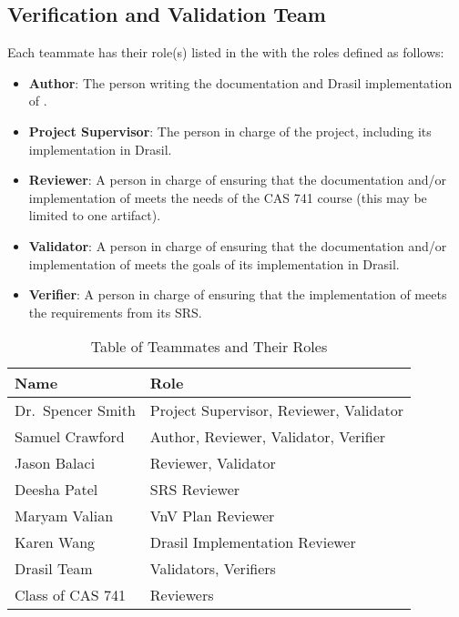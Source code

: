 \documentclass[12pt, titlepage]{article}
\begin{document}
\subsection{Verification and Validation Team} \label{sec_vnv_team}

Each teammate has their role(s) listed in the  with the
roles defined as follows:

\begin{itemize}
  \item \textbf{Author}: The person writing the documentation and Drasil
        implementation of \progname{}.

  \item \textbf{Project Supervisor}: The person in charge of the \progname{}
        project, including its implementation in Drasil.

  \item \textbf{Reviewer}: A person in charge of ensuring that the
        documentation and/or implementation of \progname{} meets the needs of
        the CAS 741 course (this may be limited to one artifact).

  \item \textbf{Validator}: A person in charge of ensuring that the
        documentation and/or implementation of \progname{} meets the goals of
        its implementation in Drasil.

  \item \textbf{Verifier}: A person in charge of ensuring that the
        implementation of \progname{} meets the requirements from its SRS.

\end{itemize}

\begin{table}[h!]
  \centering
  \begin{tabular}{| l | l |}
    \hline
    \rowcolor[gray]{0.9}
    \bf Name          & \bf Role                                \\
    \hline
    Dr.~Spencer Smith & Project Supervisor, Reviewer, Validator \\
    \hline
    Samuel Crawford   & Author, Reviewer, Validator, Verifier   \\
    \hline
    Jason Balaci      & Reviewer, Validator                     \\
    \hline
    Deesha Patel      & SRS Reviewer                            \\
    \hline
    Maryam Valian     & VnV Plan Reviewer                       \\
    \hline
    Karen Wang        & Drasil Implementation Reviewer          \\
    \hline
    Drasil Team       & Validators, Verifiers                   \\
    \hline
    Class of CAS 741  & Reviewers                               \\
    \hline
  \end{tabular}
  \caption{Table of Teammates and Their Roles}
  \label{table_team}
\end{table}
\end{document}

